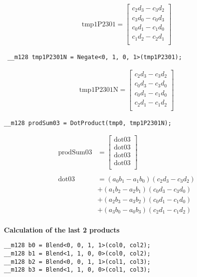 \documentclass[]{scrartcl}
\newcommand{\pth}[1]{\left(#1\right)}
\begin{document}
\begin{align*}
\mathrm{tmp1P2301} 
=
\begin{bmatrix}
c_2d_3 - c_3d_2\\
c_3d_0 - c_0d_3\\
c_0d_1 - c_1d_0\\
c_1d_2 - c_2d_1\\
\end{bmatrix}
\end{align*}

\begin{verbatim}
 __m128 tmp1P2301N = Negate<0, 1, 0, 1>(tmp1P2301);
\end{verbatim}

\begin{align*}
\mathrm{tmp1P2301N} 
=
\begin{bmatrix}
c_2d_3 - c_3d_2\\
c_0d_3 - c_3d_0\\
c_0d_1 - c_1d_0\\
c_2d_1 - c_1d_2\\
\end{bmatrix}
\end{align*}

\begin{verbatim}
__m128 prodSum03 = DotProduct(tmp0, tmp1P2301N);
\end{verbatim}

\begin{align*}
\mathrm{prodSum03} 
&=
\begin{bmatrix}
\mathrm{dot03}\\
\mathrm{dot03}\\
\mathrm{dot03}\\
\mathrm{dot03}\\
\end{bmatrix}\\
\\
\mathrm{dot03}
&= \pth{a_0b_1 - a_1b_0} \pth{c_2d_3 - c_3d_2}\\
&+ \pth{a_1b_2 - a_2b_1} \pth{c_0d_3 - c_3d_0}\\
&+ \pth{a_2b_3 - a_3b_2} \pth{c_0d_1 - c_1d_0}\\
&+ \pth{a_3b_0 - a_0b_3} \pth{c_2d_1 - c_1d_2}\\
\end{align*}


\vspace{1cm}
\textbf{Calculation of the last 2 products}
\vspace{1cm}

\begin{verbatim}
__m128 b0 = Blend<0, 0, 1, 1>(col0, col2);
__m128 b1 = Blend<1, 1, 0, 0>(col0, col2);
__m128 b2 = Blend<0, 0, 1, 1>(col1, col3);
__m128 b3 = Blend<1, 1, 0, 0>(col1, col3);
\end{verbatim}
\end{document}
